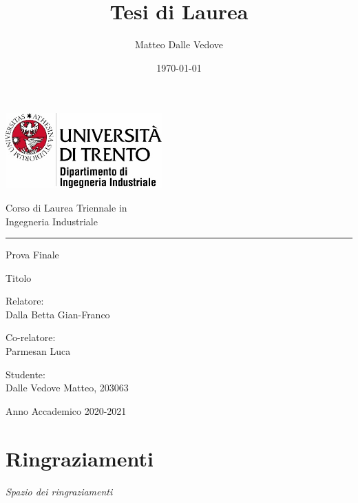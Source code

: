 \documentclass[10 pt,letterpaper,twoside,openright]{book}
\title{Tesi di Laurea}
\author{Matteo Dalle Vedove}
\date{\today}
\begin{document}
	\frontmatter
	
	\thispagestyle{empty}
	\begin{center}
		\includegraphics[width=6cm]{Immagini/logo}
		
		\vspace{2cm}
		{\Large Corso di Laurea Triennale in \\ Ingegneria Industriale}
		
		\vspace{6mm}
		
		\rule{5cm}{0.5pt}	
		\vspace{6mm}
		
		{\LARGE Prova Finale
		
		\vspace{5mm}
		
		Titolo
		 }
		
	\end{center}
	{ \large
	\vspace{1cm} \noindent
	Relatore:\\ Dalla Betta Gian-Franco
	
	\vspace{2cm} \noindent
	Co-relatore: \\ Parmesan Luca
	
	\vspace{2cm} \noindent
	Studente: \\
	Dalle Vedove Matteo, 203063
	
	\vspace{2cm}
	\begin{center}
		Anno Accademico 2020-2021
	\end{center}
	
	}

	\chapter*{Ringraziamenti}
	\begin{flushright}
		\textit{Spazio dei ringraziamenti}
	\end{flushright}

	
	\tableofcontents
	
	
	
	\mainmatter
	
\end{document}

